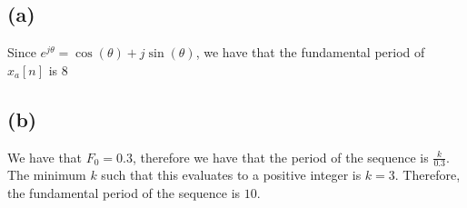 \subsection*{(a)}
Since $e^{j\theta} = \cos(\theta) + j\sin(\theta)$, we have
that the fundamental period of $\hat{x}_a[n]$ is $\boxed{8}$
\subsection*{(b)}
We have that $F_0=0.3$, therefore we have that the period of the sequence
is $\frac{k}{0.3}$. The minimum $k$ such that this evaluates to a
positive integer is $k=3$. Therefore, the fundamental period of
the sequence is $\boxed{10}$.






